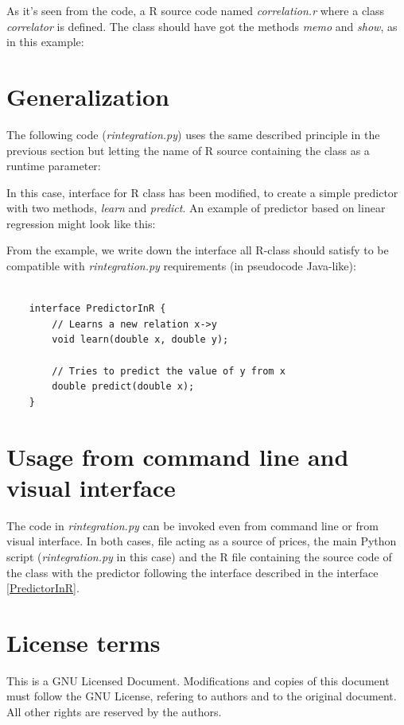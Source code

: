 \documentclass[11pt,a4paper]{article}
\begin{document}
\lstset{language=Python,frame=single,tabsize=2,basicstyle=\tiny}


As it's seen from the code, a R source code named \emph{correlation.r}
where a class \emph{correlator} is defined. The class should have got the
methods \emph{memo} and \emph{show}, as in this example:

\lstset{language=R,frame=single,tabsize=2,basicstyle=\tiny}




\section{Generalization}

The following code (\emph{rintegration.py}) uses the same described principle 
in the previous section but letting the name of R source containing the 
class as a runtime parameter:

\lstset{language=Python,frame=single,tabsize=2,basicstyle=\tiny}


In this case, interface for R class has been modified, to create a simple
predictor with two methods, \emph{learn} and \emph{predict}. An example of
predictor based on linear regression might look like this:

From the example, we write down the interface all R-class should satisfy
to be compatible with \emph{rintegration.py} requirements (in pseudocode 
Java-like):

\lstset{language=Java,frame=single,tabsize=4,basicstyle=\tiny}
\begin{lstlisting}

    interface PredictorInR {
        // Learns a new relation x->y
        void learn(double x, double y);

        // Tries to predict the value of y from x
        double predict(double x);
    }

\end{lstlisting}
\label{PredictorInR}



\section{Usage from command line and visual interface}

The code in \emph{rintegration.py} can be invoked even from command line or
from visual interface. In both cases, file acting as a source of prices,
the main Python script (\emph{rintegration.py} in this case) and the R file
containing the source code of the class with the predictor following the 
interface described in the interface \ref{PredictorInR}.


\section{License terms}

This is a GNU Licensed Document. Modifications and copies of this document
must follow the GNU License, refering to authors and to the original document.
All other rights are reserved by the authors.
\end{document}
